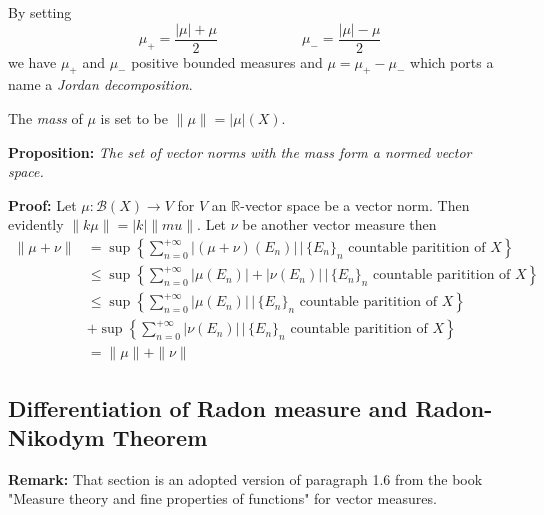 \documentclass{article}
\begin{document}
\vspace{1ex}
By setting
\[\mu_+=\frac{|\mu|+\mu}{2}\quad\quad\quad\quad\quad\quad\mu_-=\frac{|\mu|-\mu}{2}\]
we have $\mu_+$ and $\mu_-$ positive bounded measures and $\mu=\mu_+-\mu_-$
which ports a name a \emph{Jordan decomposition}.


\vspace{1ex}
The \emph{mass} of $\mu$ is set to be $\|\mu\|=|\mu|(X)$.

\vspace{1ex}
\textbf{Proposition:}
\textit{The set of vector norms with the mass form a normed vector space.}

\vspace{1ex}
\textbf{Proof:} Let $\mu:\mathcal{B}(X)\rightarrow V$ for $V$ an $\mathbb
R$-vector space be a vector norm. Then evidently $\|k\mu\|=|k|\|mu\|$. Let $\nu$
be another vector measure then
\begin{align*}
    \|\mu+\nu\|&=\sup\left\{\sum_{n=0}^{+\infty}|(\mu+\nu)(E_n)|\,|\,\{E_n\}_n\text{ countable paritition of }X\right\}\\
    &\leq\sup\left\{\sum_{n=0}^{+\infty}|\mu(E_n)|+|\nu(E_n)|\,|\,\{E_n\}_n\text{ countable paritition of }X\right\}\\
    &\leq\sup\left\{\sum_{n=0}^{+\infty}|\mu(E_n)|\,|\,\{E_n\}_n\text{ countable paritition of }X\right\}\\
    &+\sup\left\{\sum_{n=0}^{+\infty}|\nu(E_n)|\,|\,\{E_n\}_n\text{ countable paritition of }X\right\}\\
    &=\|\mu\|+\|\nu\|
\end{align*}

\subsection{Differentiation of Radon measure and Radon-Nikodym Theorem}
\textbf{Remark:} That section is an adopted version of paragraph 1.6 from the
book "Measure theory and fine properties of functions" for vector measures.
\end{document}
